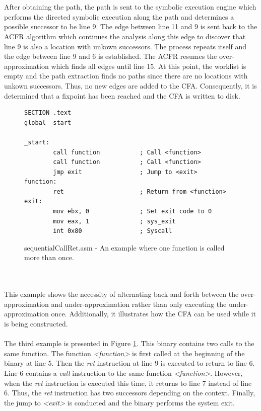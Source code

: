 \documentclass{kththesis}
\renewcommand{\it}[1]{\textit{#1}}
\begin{document}
\\ \\
After obtaining the path, the path is sent to the symbolic execution engine which performs the directed symbolic execution along the path and determines a possible successor to be line 9. The edge between line 11 and 9 is sent back to the ACFR algorithm which continues the analysis along this edge to discover that line 9 is also a location with unkown successors. The process repeats itself and the edge between line 9 and 6 is established. The ACFR resumes the over-approximation which finds all edges until line 15. At this point, the worklist is empty and the path extraction finds no paths since there are no locations with unkown successors. Thus, no new edges are added to the CFA. Consequently, it is determined that a fixpoint has been reached and the CFA is written to disk.
\begin{figure}[!t]
    \centering
\begin{tcolorbox}
\begin{verbatim}
SECTION .text
global _start

_start:
        call function           ; Call <function>
        call function           ; Call <function>
        jmp exit                ; Jump to <exit>
function:
        ret                     ; Return from <function>
exit:
        mov ebx, 0              ; Set exit code to 0
        mov eax, 1              ; sys_exit
        int 0x80                ; Syscall
\end{verbatim}
\end{tcolorbox}
\caption{sequentialCallRet.asm - An example where one function is called more than once.}
    \label{fig:sequentialCallRet}
\end{figure}
\\ \\
This example shows the necessity of alternating back and forth between the over-approximation and
under-approximation rather than only executing the under-approximation once. Additionally, it illustrates how the CFA can be used while it is being constructed.
\\ \\
The third example is presented in Figure \ref{fig:sequentialCallRet}. This binary contains two calls to the same function. The function \it{<function>} is first called at the beginning of the binary at line 5. Then the \it{ret} instruction at line 9 is executed to return to line 6. Line 6 contains a \it{call} instruction to the same function \it{<function>}. However, when the \it{ret} instruction is executed this time, it returns to line 7 instead of line 6. Thus, the \it{ret} instruction has two successors depending on the context. Finally, the jump to \it{<exit>} is conducted and the binary performs the system exit.
\end{document}
